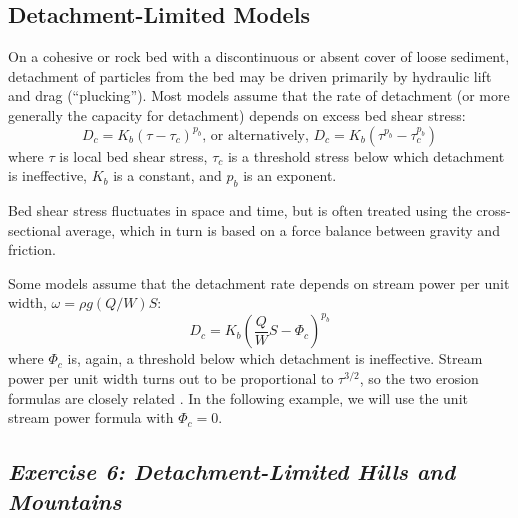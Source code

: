 \documentclass[12pt,reqno]{amsart}
\begin{document}
\subsection{Detachment-Limited Models}

On a cohesive or rock bed with a discontinuous or absent cover of loose sediment, detachment of particles from the bed may be driven primarily by hydraulic lift and drag (``plucking''). Most models assume that the rate of detachment (or more generally the capacity for detachment) depends on excess bed shear stress:
\begin{equation}
D_c = K_b \left( \tau - \tau_c \right)^{p_b} \text{, or alternatively, }
D_c = K_b \left( \tau^{p_b} - \tau_c^{p_b} \right)
\end{equation}
where $\tau$ is local bed shear stress, $\tau_c$ is a threshold stress below which detachment is ineffective, $K_b$ is a constant, and $p_b$ is an exponent.

Bed shear stress fluctuates in space and time, but is often treated using the cross-sectional average, which in turn is based on a force balance between gravity and friction.

Some models assume that the detachment rate depends on stream power per unit
width, $\omega = \rho g (Q/W) S$:
\begin{equation}
D_c = K_b \left( \frac{Q}{W}S - \Phi_c \right)^{p_b}
\end{equation}
where $\Phi_c$ is, again, a threshold below which detachment is
ineffective. Stream power per unit width turns out to be proportional to $\tau^{3/2}$, so the two erosion formulas are closely related \citep{whipple1999dynamics}. In the following example, we will use the unit stream power formula with $\Phi_c=0$.

\subsection*{\em Exercise 6: Detachment-Limited Hills and Mountains}
\end{document}
